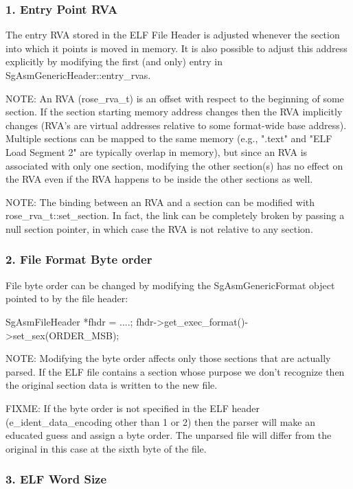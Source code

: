 \subsubsection{1. Entry Point RVA}

   The entry RVA stored in the ELF File Header is adjusted whenever the section into which it points is moved in memory. It is
   also possible to adjust this address explicitly by modifying the first (and only) entry in SgAsmGenericHeader::entry\_rvas.

   NOTE: An RVA (rose\_rva\_t) is an offset with respect to the beginning of some section. If the section starting memory address
   changes then the RVA implicitly changes (RVA's are virtual addresses relative to some format-wide base address). Multiple
   sections can be mapped to the same memory (e.g., ".text" and "ELF Load Segment 2" are typically overlap in memory), but
   since an RVA is associated with only one section, modifying the other section(s) has no effect on the RVA even if the RVA
   happens to be inside the other sections as well.

   NOTE: The binding between an RVA and a section can be modified with rose\_rva\_t::set\_section. In fact, the link can be
   completely broken by passing a null section pointer, in which case the RVA is not relative to any section.

\subsubsection{2. File Format Byte order}

   File byte order can be changed by modifying the SgAsmGenericFormat object pointed to by the file header:

      SgAsmFileHeader *fhdr = ....;
      fhdr->get\_exec\_format()->set\_sex(ORDER\_MSB);

   NOTE: Modifying the byte order affects only those sections that are actually parsed. If the ELF file contains a section
   whose purpose we don't recognize then the original section data is written to the new file.

   FIXME: If the byte order is not specified in the ELF header (e\_ident\_data\_encoding other than 1 or 2) then the parser will
   make an educated guess and assign a byte order.  The unparsed file will differ from the original in this case at the sixth
   byte of the file.

\subsubsection{3. ELF Word Size}

